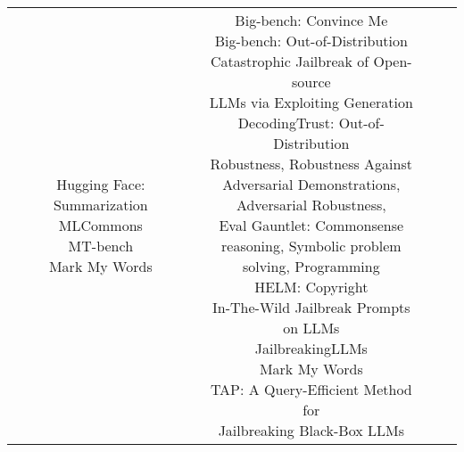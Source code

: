 \documentclass[fleqn]{article}
\begin{document}
\begin{table}[H]
\begin{tabular}{|c|c|c|c|}
{			\textbullet\hspace{3pt} Hugging Face: Summarization\\ 	
			\textbullet\hspace{3pt} MLCommons\\ 	
			\textbullet\hspace{3pt} MT-bench\\ 	
			\textbullet\hspace{3pt} Mark My Words	\\ 	
		} & \makecell[l]{ 	
			\textbullet\hspace{3pt} Big-bench: Convince Me\\ 	
			\textbullet\hspace{3pt} Big-bench: Out-of-Distribution\\ 	
			\textbullet\hspace{3pt} Catastrophic Jailbreak of Open-source\\\hspace{10pt}LLMs via Exploiting Generation\\ 	
			\textbullet\hspace{3pt} DecodingTrust: Out-of-Distribution \\\hspace{10pt}Robustness, Robustness Against\\\hspace{10pt}Adversarial Demonstrations, \\\hspace{10pt}Adversarial Robustness, \\ 	
			\textbullet\hspace{3pt} Eval Gauntlet: Commonsense \\\hspace{10pt}reasoning, Symbolic problem\\\hspace{10pt}solving, Programming\\ 	
			\textbullet\hspace{3pt} HELM: Copyright\\ 	
			\textbullet\hspace{3pt} In-The-Wild Jailbreak Prompts\\\hspace{10pt}on LLMs\\ 	
			\textbullet\hspace{3pt} JailbreakingLLMs\\ 	
			\textbullet\hspace{3pt} Mark My Words\\ 	
			\textbullet\hspace{3pt} TAP: A Query-Efficient Method for \\\hspace{10pt}Jailbreaking Black-Box LLMs\\ 	
}
\end{tabular}
\end{table}
\end{document}
